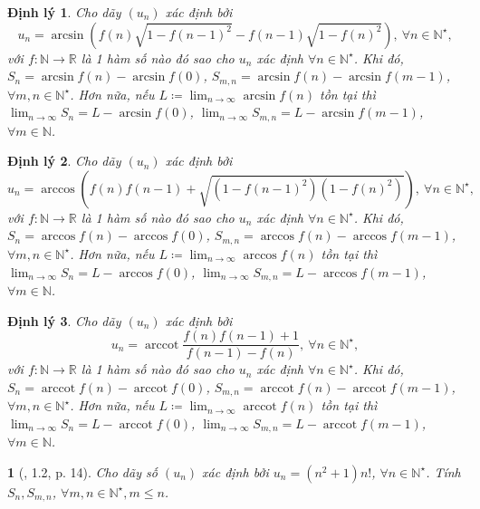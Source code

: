 \documentclass{article}
\newtheorem{baitoan}{}
\newtheorem{dinhly}{Định lý}
\begin{document}
\begin{dinhly}
	Cho dãy $(u_n)$ xác định bởi
	\begin{equation*}
		u_n = \arcsin\left(f(n)\sqrt{1 - f(n-1)^2} - f(n-1)\sqrt{1 - f(n)^2}\right),\ \forall n\in\mathbb{N}^\star,
	\end{equation*}
	với $f:\mathbb{N}\to\mathbb{R}$ là 1 hàm số nào đó sao cho $u_n$ xác định $\forall n\in\mathbb{N}^\star$. Khi đó, $S_n = \arcsin f(n) - \arcsin f(0)$, $S_{m,n} = \arcsin f(n) - \arcsin f(m - 1)$, $\forall m,n\in\mathbb{N}^\star$. Hơn nữa, nếu $L\coloneqq\lim_{n\to\infty} \arcsin f(n)$ tồn tại thì $\lim_{n\to\infty} S_n = L - \arcsin f(0)$, $\lim_{n\to\infty} S_{m,n} = L - \arcsin f(m - 1)$, $\forall m\in\mathbb{N}$.
\end{dinhly}

\begin{dinhly}
	Cho dãy $(u_n)$ xác định bởi
	\begin{equation*}
		u_n = \arccos\left(f(n)f(n-1) + \sqrt{(1 - f(n-1)^2)(1 - f(n)^2)}\right),\ \forall n\in\mathbb{N}^\star,
	\end{equation*}
	với $f:\mathbb{N}\to\mathbb{R}$ là 1 hàm số nào đó sao cho $u_n$ xác định $\forall n\in\mathbb{N}^\star$. Khi đó, $S_n = \arccos f(n) - \arccos f(0)$, $S_{m,n} = \arccos f(n) - \arccos f(m - 1)$, $\forall m,n\in\mathbb{N}^\star$. Hơn nữa, nếu $L\coloneqq\lim_{n\to\infty} \arccos f(n)$ tồn tại thì $\lim_{n\to\infty} S_n = L - \arccos f(0)$, $\lim_{n\to\infty} S_{m,n} = L - \arccos f(m - 1)$, $\forall m\in\mathbb{N}$.
\end{dinhly}

\begin{dinhly}
	Cho dãy $(u_n)$ xác định bởi
	\begin{equation*}
		u_n = \operatorname{arccot}\dfrac{f(n)f(n-1) + 1}{f(n-1) - f(n)},\ \forall n\in\mathbb{N}^\star,
	\end{equation*}
	với $f:\mathbb{N}\to\mathbb{R}$ là 1 hàm số nào đó sao cho $u_n$ xác định $\forall n\in\mathbb{N}^\star$. Khi đó, $S_n = \operatorname{arccot}f(n) - \operatorname{arccot}f(0)$, $S_{m,n} = \operatorname{arccot}f(n) - \operatorname{arccot}f(m - 1)$, $\forall m,n\in\mathbb{N}^\star$. Hơn nữa, nếu $L\coloneqq\lim_{n\to\infty} \operatorname{arccot}f(n)$ tồn tại thì $\lim_{n\to\infty} S_n = L - \operatorname{arccot}f(0)$, $\lim_{n\to\infty} S_{m,n} = L - \operatorname{arccot}f(m - 1)$, $\forall m\in\mathbb{N}$.
\end{dinhly}

\begin{baitoan}[\cite{Quoc_Long_Dat_Nam_VMC}, 1.2, p. 14]
	Cho dãy số $(u_n)$ xác định bởi $u_n = (n^2 + 1)n!$, $\forall n\in\mathbb{N}^\star$. Tính $S_n,S_{m,n}$, $\forall m,n\in\mathbb{N}^\star,m\le n$.
\end{baitoan}
\end{document}

